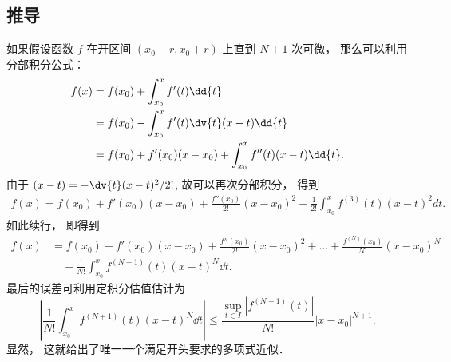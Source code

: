 \subsection{推导}
如果假设函数 $f$ 在开区间 $(x_0-r,x_0+r)$ 上直到 $N+1$ 次可微， 那么可以利用分部积分公式：
\begin{equation}
\begin{aligned}
f(x)
&=f(x_0)+\int_{x_0}^{x}f'(t)\dd{t}\\
&=f(x_0)-\int_{x_0}^{x}f'(t)\dv{t}(x-t) \dd{t}\\
&=f(x_0)+f'(x_0)(x-x_0)+\int_{x_0}^{x}f''(t)(x-t) \dd{t}.
\end{aligned}
\end{equation}
由于 $(x-t)=-\dv{t} (x-t)^2/2!$, 故可以再次分部积分， 得到
\begin{equation}
\begin{aligned}
f(x)
=f(x_0)+f'(x_0)(x-x_0)+\frac{f''(x_0)}{2!}(x-x_0)^2
+\frac{1}{2!}\int_{x_0}^{x}f^{(3)}(t)(x-t)^2dt.
\end{aligned}
\end{equation}
如此续行， 即得到
\begin{equation}
\begin{aligned}
f(x)
&=f(x_0)+f'(x_0)(x-x_0)+\frac{f''(x_0)}{2!}(x-x_0)^2+...+\frac{f^{(N)}(x_0)}{N!}(x-x_0)^N\\
&\quad+\frac{1}{N!}\int_{x_0}^{x}f^{(N+1)}(t)(x-t)^{N} \dd{t}.
\end{aligned}
\end{equation}
最后的误差可利用定积分估值估计为
\begin{equation}
\left|\frac{1}{N!}\int_{x_0}^{x}f^{(N+1)}(t)(x-t)^{N} \dd{t} \right|
\leq\frac{\sup_{t\in I}|f^{(N+1)}(t)|}{N!}|x-x_0|^{N+1}.
\end{equation}
显然， 这就给出了唯一一个满足开头要求的多项式近似．